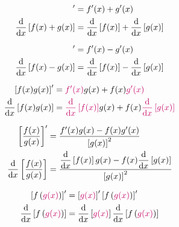 \documentclass[20150903-160354-rs2.2-MarksMathNotebook.tex]{subfiles}
\begin{document}
\begin{arule}
\begin{align}
	[f(x) + g(x)]' &= f'(x) + g'(x) \label{eq:ds1} \\
	\dfrac{\dd}{\dx} \left[f(x) + g(x) \right] &= \dfrac{\dd}{\dx} \left[f(x) \right] + \dfrac{\dd}{\dx} \left[g(x) \right]  \label{eq:ds2}
\end{align}
\end{arule}

\begin{arule}
\begin{align}
	[f(x) - g(x)]' &= f'(x) - g'(x) \label{eq:dd1} \\
	\dfrac{\dd}{\dx} \left[f(x) - g(x) \right] &= \dfrac{\dd}{\dx} \left[f(x) \right] - \dfrac{\dd}{\dx} \left[g(x) \right]  \label{eq:dd2}
\end{align}
\end{arule}

\begin{arule}
\begin{align}
	\left[f(x)g(x) \right]' &= \cRed{f'(x)}g(x) + f(x)\cRed{g'(x)} \label{eq:dpr1} \\
	\dfrac{\dd}{\dx} \left[f(x)g(x) \right] &= \cRed{\dfrac{\dd}{\dx} \left[f(x) \right]}g(x) + f(x)\cRed{\dfrac{\dd}{\dx} \left[g(x)\right]}  \label{eq:dpr2}
\end{align}
\end{arule}

\begin{arule}
\begin{align}
	\left[ \dfrac{f(x)}{g(x)} \right]' &= \dfrac{f'(x)g(x)-f(x)g'(x)}{\left[g(x)\right]^2} \label{eq:drf1} \\
	\dfrac{\mathrm{d}}{\mathrm{d}x} \left[ \dfrac{f(x)}{g(x)} \right] & = \dfrac{\dfrac{\mathrm{d}}{\mathrm{d}x}\left[f(x)\right]g(x)-f(x) \dfrac{\mathrm{d}}{\mathrm{d}x} \left[g(x)\right] }{\left[g(x)\right]^2}  \label{eq:drf2}
\end{align}
\end{arule}

\begin{arule}
\begin{align}
	\left[f \left( \cRed{g(x)} \right) \right]' &= \left[\cRed{g(x)} \right]' \left[f\left(\cRed{g(x)}\right)\right]' \label{eq:dcf1} \\
	\dfrac{\dd}{\dx} \left[f \left( \cRed{g(x)} \right) \right] &= \dfrac{\dd}{\dx} \left[\cRed{g(x)} \right] \dfrac{\dd}{\dx} \left[f\left(\cRed{g(x)}\right)\right]  \label{eq:dcf2}
\end{align}
\end{arule}
\end{document}
